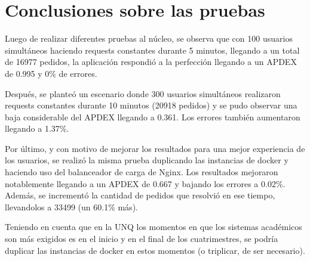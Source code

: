 \section{Conclusiones sobre las pruebas}

Luego de realizar diferentes pruebas al núcleo, se observa que con 100 usuarios simultáneos haciendo requests constantes durante 5 minutos, llegando a un total de 16977 pedidos, la aplicación respondió a la perfección llegando a un APDEX de 0.995 y 0\% de errores.

Después, se planteó un escenario donde 300 usuarios simultáneos realizaron requests constantes durante 10 minutos (20918 pedidos) y se pudo observar una baja considerable del APDEX llegando a 0.361. Los errores también aumentaron llegando a 1.37\%. 

Por último, y con motivo de mejorar los resultados para una mejor experiencia de los usuarios, se realizó la misma prueba duplicando las instancias de docker y haciendo uso del balanceador de carga de Nginx. Los resultados mejoraron notablemente llegando a un APDEX de 0.667 y bajando los errores a 0.02\%. Además, se incrementó la cantidad de pedidos que resolvió en ese tiempo, llevandolos a 33499 (un 60.1\% más).

Teniendo en cuenta que en la UNQ los momentos en que los sistemas académicos son más exigidos es en el inicio y en el final de los cuatrimestres, se podría duplicar las instancias de docker en estos momentos (o triplicar, de ser necesario).
